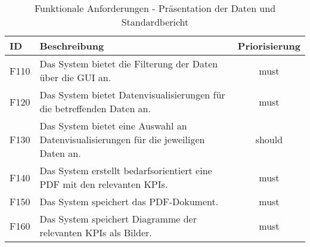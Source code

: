 \begingroup
\setlength{\tabcolsep}{10pt} %
\renewcommand{\arraystretch}{1.25} 
\begin{table}[h]
    \centering
    \begin{adjustbox}{max width=\textwidth}
    \begin{tabular}{lp{13cm}c}
       \toprule
       \textbf{ID}          & \textbf{Beschreibung} &\textbf{Priorisierung}\\
       \midrule
        F110                              &Das System bietet die Filterung der Daten über die GUI an.  & must\\
        F120                              &Das System bietet Datenvisualisierungen für die betreffenden Daten an. & must\\
        F130                              &Das System bietet eine Auswahl an Datenvisualisierungen für die jeweiligen Daten an. & should\\
        F140                              &Das System erstellt bedarfsorientiert eine PDF mit den relevanten KPIs. & must\\
        F150                              &Das System speichert das PDF-Dokument. & must\\
        F160                              &Das System speichert Diagramme der relevanten KPIs als Bilder. & must\\
        \bottomrule
    \end{tabular}
    \end{adjustbox}
    \caption{%
        Funktionale Anforderungen - Präsentation der Daten und Standardbericht
    }
    \label{tab:funktionale Anforderungen III}
    \end{table}
\endgroup






